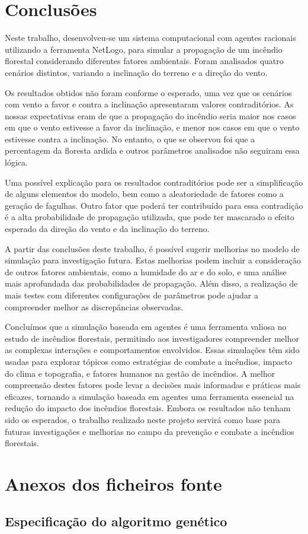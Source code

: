 \documentclass[a4paper, portuguese]{report}
\begin{document}
    \chapter{Conclusões}\label{ch:conclusoes}
    Neste trabalho, desenvolveu-se um sistema computacional com agentes racionais utilizando a ferramenta NetLogo, para simular a propagação de um incêndio florestal considerando diferentes fatores ambientais.
    Foram analisados quatro cenários distintos, variando a inclinação do terreno e a direção do vento.

    Os resultados obtidos não foram conforme o esperado, uma vez que os cenários com vento a favor e contra a inclinação apresentaram valores contraditórios.
    As nossas expectativas eram de que a propagação do incêndio seria maior nos casos em que o vento estivesse a favor da inclinação, e menor nos casos em que o vento estivesse contra a inclinação.
    No entanto, o que se observou foi que a percentagem da floresta ardida e outros parâmetros analisados não seguiram essa lógica.

    Uma possível explicação para os resultados contraditórios pode ser a simplificação de alguns elementos do modelo, bem como a aleatoriedade de fatores como a geração de fagulhas.
    Outro fator que poderá ter contribuído para essa contradição é a alta probabilidade de propagação utilizada, que pode ter mascarado o efeito esperado da direção do vento e da inclinação do terreno.

    A partir das conclusões deste trabalho, é possível sugerir melhorias no modelo de simulação para investigação futura.
    Estas melhorias podem incluir a consideração de outros fatores ambientais, como a humidade do ar e do solo, e uma análise mais aprofundada das probabilidades de propagação.
    Além disso, a realização de mais testes com diferentes configurações de parâmetros pode ajudar a compreender melhor as discrepâncias observadas.

    Concluímos que a simulação baseada em agentes é uma ferramenta valiosa no estudo de incêndios florestais, permitindo aos investigadores compreender melhor as complexas interações e comportamentos envolvidos.
    Essas simulações têm sido usadas para explorar tópicos como estratégias de combate a incêndios, impacto do clima e topografia, e fatores humanos na gestão de incêndios.
    A melhor compreensão destes fatores pode levar a decisões mais informadas e práticas mais eficazes, tornando a simulação baseada em agentes uma ferramenta essencial na redução do impacto dos incêndios florestais.
    Embora os resultados não tenham sido os esperados, o trabalho realizado neste projeto servirá como base para futuras investigações e melhorias no campo da prevenção e combate a incêndios florestais.

    \appendix


    \chapter{Anexos dos ficheiros fonte}\label{ch:appendix}


    \section{Especificação do algoritmo genético}\label{sec:model_spec}
    \inputminted[breaklines]{python}{src/genalg.py}
    
    
\end{document}
